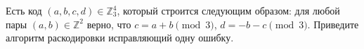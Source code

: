 Есть код $(a, b, c, d) \in \mathbb{Z}_3^4$, который строится следующим образом: для любой пары
$(a, b) \in \mathbb{Z}^2$ верно, что $c = a + b \pmod{3}$, $d = -b - c \pmod{3}$. Приведите алгоритм
раскодировки исправляющий одну ошибку.
